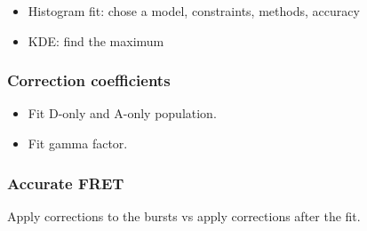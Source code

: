 \begin{itemize}
\item Histogram fit: chose a model, constraints, methods, accuracy
\item KDE: find the maximum
\end{itemize}

\subsubsection{Correction coefficients}

\begin{itemize}
\item Fit D-only and A-only population.
\item Fit gamma factor.
\end{itemize}


\subsubsection{Accurate FRET}

Apply corrections to the bursts vs apply corrections after the fit.

